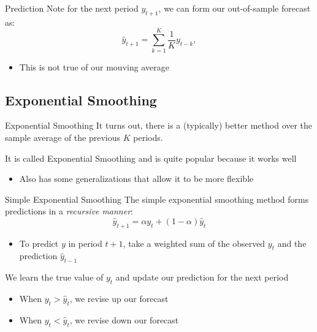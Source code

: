 \documentclass[aspectratio=169,t,11pt,table]{beamer}
\begin{document}

\begin{frame}{Prediction}
  Note for the next period $y_{t+1}$, we can form our out-of-sample forecast as:
  $$
    \hat{y}_{t+1} = \sum_{k=1}^K \frac{1}{K} y_{t - k},
  $$
  \begin{itemize}
    \item This is not true of our mouving average
  \end{itemize}
\end{frame}

\subsection{Exponential Smoothing}

\begin{frame}{Exponential Smoothing}
  It turns out, there is a (typically) better method over the sample average of the previous $K$ periods. 

  \bigskip
  It is called \alert{Exponential Smoothing} and is quite popular because it works well
  \begin{itemize}
    \item Also has some generalizations that allow it to be more flexible
  \end{itemize}
\end{frame}

\begin{frame}{Simple Exponential Smoothing}
  The \alert{simple exponential smoothing} method forms predictions in a \emph{recursive manner}:
  $$
    \hat{y}_{t+1} = \alpha y_t + (1 - \alpha) \hat{y}_{t}
  $$
  \begin{itemize}
    \item To predict $y$ in period $t+1$, take a weighted sum of the observed $y_t$ and the prediction $\hat{y}_{t-1}$    
  \end{itemize}

  
  \bigskip
  We learn the true value of $y_t$ and update our prediction for the next period
  
  \begin{itemize}
    \item When $y_t > \hat{y}_t$, we revise up our forecast
    
    \item When $y_t < \hat{y}_t$, we revise down our forecast
  \end{itemize}
\end{frame}
\end{document}
